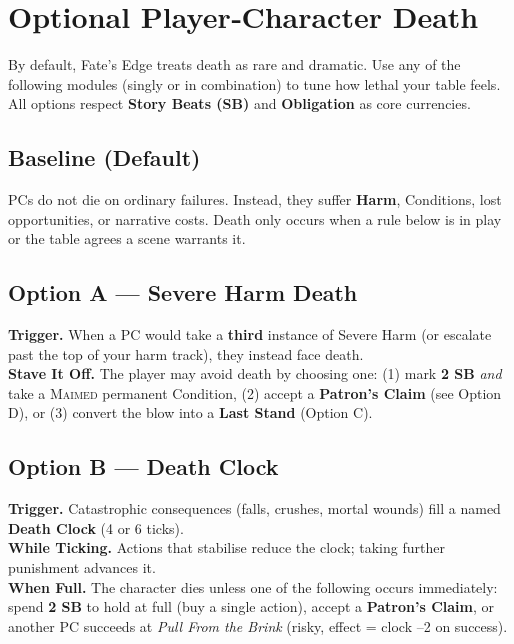 \section{Optional Player‑Character Death}
\label{sec:pc-death-optional}

By default, Fate's Edge treats death as rare and dramatic. Use any of the following modules (singly or in combination) to tune how lethal your table feels. All options respect \textbf{Story Beats (SB)} and \textbf{Obligation} as core currencies.

\subsection*{Baseline (Default)}
PCs do not die on ordinary failures. Instead, they suffer \textbf{Harm}, Conditions, lost opportunities, or narrative costs. Death only occurs when a rule below is in play or the table agrees a scene warrants it.

\subsection*{Option A — Severe Harm Death}
\textbf{Trigger.} When a PC would take a \textbf{third} instance of Severe Harm (or escalate past the top of your harm track), they instead face death.\\
\textbf{Stave It Off.} The player may avoid death by choosing one: (1) mark \textbf{2 SB} \emph{and} take a \textsc{Maimed} permanent Condition, (2) accept a \textbf{Patron's Claim} (see Option D), or (3) convert the blow into a \textbf{Last Stand} (Option C).

\subsection*{Option B — Death Clock}
\textbf{Trigger.} Catastrophic consequences (falls, crushes, mortal wounds) fill a named \textbf{Death Clock} (4 or 6 ticks).\\
\textbf{While Ticking.} Actions that stabilise reduce the clock; taking further punishment advances it.\\
\textbf{When Full.} The character dies unless one of the following occurs immediately: spend \textbf{2 SB} to hold at full (buy a single action), accept a \textbf{Patron's Claim}, or another PC succeeds at \emph{Pull From the Brink} (risky, effect = clock –2 on success).

